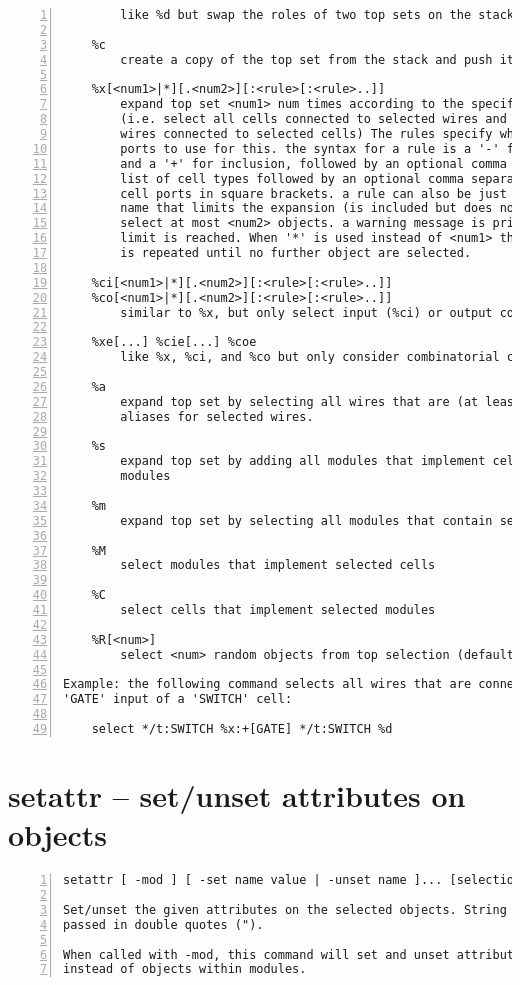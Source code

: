 \begin{lstlisting}[numbers=left,frame=single]
    %D
        like %d but swap the roles of two top sets on the stack

    %c
        create a copy of the top set from the stack and push it

    %x[<num1>|*][.<num2>][:<rule>[:<rule>..]]
        expand top set <num1> num times according to the specified rules.
        (i.e. select all cells connected to selected wires and select all
        wires connected to selected cells) The rules specify which cell
        ports to use for this. the syntax for a rule is a '-' for exclusion
        and a '+' for inclusion, followed by an optional comma separated
        list of cell types followed by an optional comma separated list of
        cell ports in square brackets. a rule can also be just a cell or wire
        name that limits the expansion (is included but does not go beyond).
        select at most <num2> objects. a warning message is printed when this
        limit is reached. When '*' is used instead of <num1> then the process
        is repeated until no further object are selected.

    %ci[<num1>|*][.<num2>][:<rule>[:<rule>..]]
    %co[<num1>|*][.<num2>][:<rule>[:<rule>..]]
        similar to %x, but only select input (%ci) or output cones (%co)

    %xe[...] %cie[...] %coe
        like %x, %ci, and %co but only consider combinatorial cells

    %a
        expand top set by selecting all wires that are (at least in part)
        aliases for selected wires.

    %s
        expand top set by adding all modules that implement cells in selected
        modules

    %m
        expand top set by selecting all modules that contain selected objects

    %M
        select modules that implement selected cells

    %C
        select cells that implement selected modules

    %R[<num>]
        select <num> random objects from top selection (default 1)

Example: the following command selects all wires that are connected to a
'GATE' input of a 'SWITCH' cell:

    select */t:SWITCH %x:+[GATE] */t:SWITCH %d
\end{lstlisting}

\section{setattr -- set/unset attributes on objects}
\label{cmd:setattr}
\begin{lstlisting}[numbers=left,frame=single]
    setattr [ -mod ] [ -set name value | -unset name ]... [selection]

Set/unset the given attributes on the selected objects. String values must be
passed in double quotes (").

When called with -mod, this command will set and unset attributes on modules
instead of objects within modules.
\end{lstlisting}

